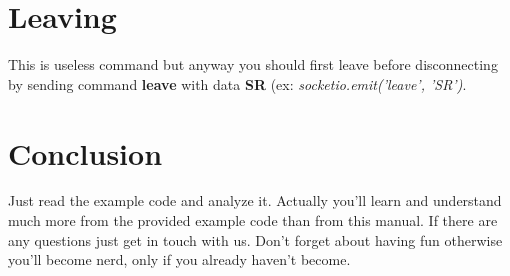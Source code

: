 \documentclass[10pt]{article}
\begin{document}
\section{Leaving}
This is useless command but anyway you should first leave before disconnecting by sending command \textbf{leave} with data \textbf{SR} (ex: \textit{socketio.emit('leave', 'SR')}.

\section{Conclusion}
Just read the example code and analyze it. Actually you'll learn and understand much more from the provided example code than from this manual. If there are any questions just get in touch with us. Don't forget about having fun otherwise you'll become nerd, only if you already haven't become.
\end{document}
